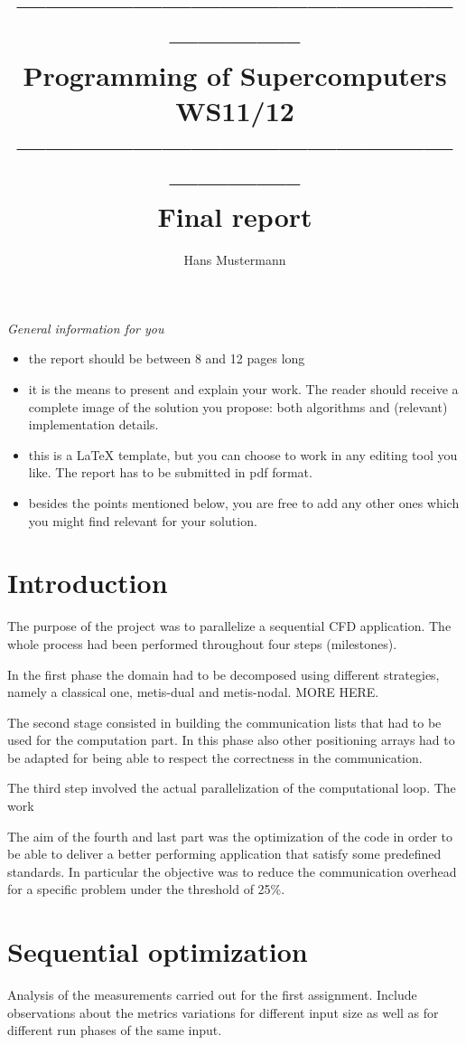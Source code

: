 \documentclass[12pt, a4paper]{article}
\title{----------------------------------------------------------- \\
        {\bf Programming of Supercomputers WS11/12}\\ 
        ----------------------------------------------------------- \\ 
        Final report}
\author{Hans Mustermann}
\date{ }
\newcommand{\draft}[1]{\textcolor{NavyBlue}{#1}}
\newcommand{\hint}[1]{\textcolor{OliveGreen}{{\it#1}}}
\begin{document}
  \maketitle

\hint{General information for you
\begin{itemize}
	\item the report should be between 8 and 12 pages long
	\item it is the means to present and explain your work. The reader should receive a complete image of the solution you propose: both algorithms and  (relevant) implementation details.
	\item this is a LaTeX template, but you can choose to work in any editing tool you like. The report has to be submitted in pdf format.
	\item besides the points mentioned below, you are free to add any other ones which you might find relevant for your solution.
\end{itemize}}

\section{Introduction}
The purpose of the project was to parallelize a sequential CFD application. The
whole process had been performed throughout four steps (milestones).

In the first phase the domain had to be decomposed using different strategies,
namely a classical one, metis-dual and metis-nodal. 
MORE HERE.

The second stage consisted in building the communication lists that had to be
used for the computation part. In this phase also other positioning arrays had
to be adapted for being able to respect the correctness in the communication.

The third step involved the actual parallelization of the computational loop.
The work

The aim of the fourth and last part was the optimization of the code in order to
be able to deliver a better performing application that satisfy some predefined
standards. In particular the objective was to reduce the communication overhead
for a specific problem under the threshold of 25\%. 

\section{Sequential optimization}
\draft{Analysis of the measurements carried out for the first assignment. Include observations about the metrics variations for different input size as well as for different run phases of the same input.}
\end{document}
